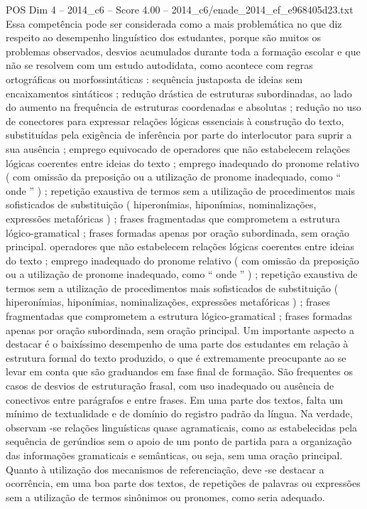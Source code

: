 \begin{textsample}{POS Dim 4 – 2014\_c6 – Score 4.00 – 2014\_c6/enade\_2014\_ef\_e968405d23.txt}
Essa competência pode ser considerada como a mais problemática no que diz respeito ao desempenho linguístico dos estudantes, porque são muitos os problemas observados, desvios acumulados durante toda a formação escolar e que não se resolvem com um estudo autodidata, como acontece com regras ortográficas ou morfossintáticas : sequência justaposta de ideias sem encaixamentos sintáticos ; redução drástica de estruturas subordinadas, ao lado do aumento na frequência de estruturas coordenadas e absolutas ; redução no uso de conectores para expressar relações lógicas essenciais à construção do texto, substituídas pela exigência de inferência por parte do interlocutor para suprir a sua ausência ; emprego equivocado de operadores que não estabelecem relações lógicas coerentes entre ideias do texto ; emprego inadequado do pronome relativo ( com omissão da preposição ou a utilização de pronome inadequado, como “ onde ” ) ; repetição exaustiva de termos sem a utilização de procedimentos mais sofisticados de substituição ( hiperonímias, hiponímias, nominalizações, expressões metafóricas ) ; frases fragmentadas que comprometem a estrutura lógico-gramatical ; frases formadas apenas por oração subordinada, sem oração principal. operadores que não estabelecem relações lógicas coerentes entre ideias do texto ; emprego inadequado do pronome relativo ( com omissão da preposição ou a utilização de pronome inadequado, como “ onde ” ) ; repetição exaustiva de termos sem a utilização de procedimentos mais sofisticados de substituição ( hiperonímias, hiponímias, nominalizações, expressões metafóricas ) ; frases fragmentadas que comprometem a estrutura lógico-gramatical ; frases formadas apenas por oração subordinada, sem oração principal.
Um importante aspecto a destacar é o baixíssimo desempenho de uma parte dos estudantes em relação à estrutura formal do texto produzido, o que é extremamente preocupante ao se levar em conta que são graduandos em fase final de formação.
São frequentes os casos de desvios de estruturação frasal, com uso inadequado ou ausência de conectivos entre parágrafos e entre frases.
Em uma parte dos textos, falta um mínimo de textualidade e de domínio do registro padrão da língua.
Na verdade, observam -se relações linguísticas quase agramaticais, como as estabelecidas pela sequência de gerúndios sem o apoio de um ponto de partida para a organização das informações gramaticais e semânticas, ou seja, sem uma oração principal.
Quanto à utilização dos mecanismos de referenciação, deve -se destacar a ocorrência, em uma boa parte dos textos, de repetições de palavras ou expressões sem a utilização de termos sinônimos ou pronomes, como seria adequado.

\end{textsample}
